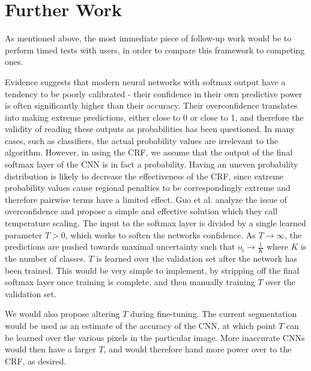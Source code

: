 

\section{Further Work}
As mentioned above, the most immediate piece of follow-up work would be to perform timed tests with users, in order to compare this framework to competing ones. 

Evidence suggests that modern neural networks with softmax output have a tendency to be poorly calibrated \cite{calibration} - their confidence in their own predictive power is often significantly higher than their accuracy. Their overconfidence translates into making extreme predictions, either close to 0 or close to 1, and therefore the validity of reading these outputs as probabilities has been questioned. In many cases, such as classifiers, the actual probability values are irrelevant to the algorithm. However, in using the CRF, we assume that the output of the final softmax layer of the CNN is in fact a probability. Having an uneven probability distribution is likely to decrease the effectiveness of the CRF, since extreme probability values cause regional penalties to be correspondingly extreme and therefore pairwise terms have a limited effect. Guo et al. \cite{calibration} analyze the issue of overconfidence and propose a simple and effective solution which they call temperature scaling. The input to the softmax layer is divided by a single learned parameter $T > 0$, which works to soften the networks confidence. As $T \rightarrow \infty$, the predictions are pushed towards maximal uncertainty such that $o_i \rightarrow \frac{1}{K}$ where $K$ is the number of classes. $T$ is learned over the validation set after the network has been trained. This would be very simple to implement, by stripping off the final softmax layer once training is complete, and then manually training $T$ over the validation set. 

We would also propose altering $T$ during fine-tuning. The current segmentation would be used as an estimate of the accuracy of the CNN, at which point $T$ can be learned over the various pixels in the particular image. More inaccurate CNNs would then have a larger $T$, and would therefore hand more power over to the CRF, as desired. 

